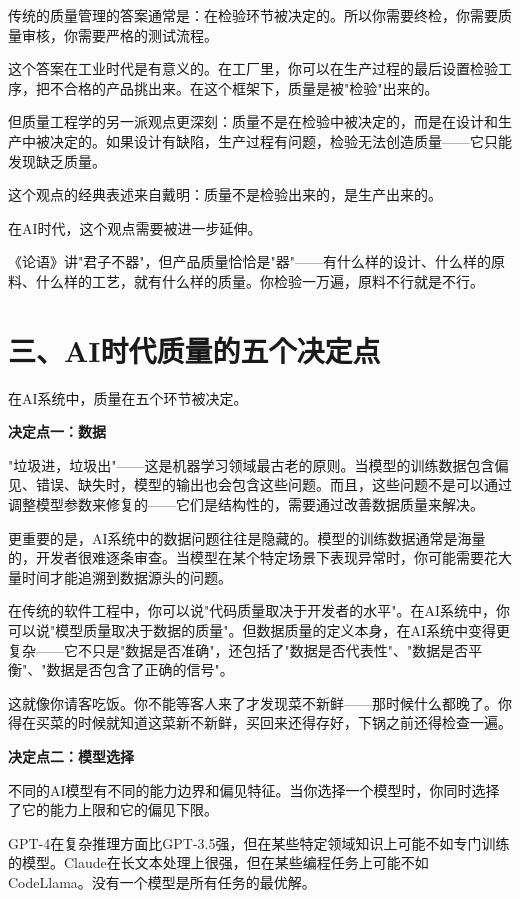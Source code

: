 传统的质量管理的答案通常是：在检验环节被决定的。所以你需要终检，你需要质量审核，你需要严格的测试流程。

这个答案在工业时代是有意义的。在工厂里，你可以在生产过程的最后设置检验工序，把不合格的产品挑出来。在这个框架下，质量是被"检验"出来的。

但质量工程学的另一派观点更深刻：质量不是在检验中被决定的，而是在设计和生产中被决定的。如果设计有缺陷，生产过程有问题，检验无法创造质量——它只能发现缺乏质量。

这个观点的经典表述来自戴明：质量不是检验出来的，是生产出来的。

在AI时代，这个观点需要被进一步延伸。

《论语》讲"君子不器"，但产品质量恰恰是"器"——有什么样的设计、什么样的原料、什么样的工艺，就有什么样的质量。你检验一万遍，原料不行就是不行。

\section{三、AI时代质量的五个决定点}


在AI系统中，质量在五个环节被决定。

\textbf{决定点一：数据}

"垃圾进，垃圾出"——这是机器学习领域最古老的原则。当模型的训练数据包含偏见、错误、缺失时，模型的输出也会包含这些问题。而且，这些问题不是可以通过调整模型参数来修复的——它们是结构性的，需要通过改善数据质量来解决。

更重要的是，AI系统中的数据问题往往是隐藏的。模型的训练数据通常是海量的，开发者很难逐条审查。当模型在某个特定场景下表现异常时，你可能需要花大量时间才能追溯到数据源头的问题。

在传统的软件工程中，你可以说"代码质量取决于开发者的水平"。在AI系统中，你可以说"模型质量取决于数据的质量"。但数据质量的定义本身，在AI系统中变得更复杂——它不只是"数据是否准确"，还包括了"数据是否代表性"、"数据是否平衡"、"数据是否包含了正确的信号"。

这就像你请客吃饭。你不能等客人来了才发现菜不新鲜——那时候什么都晚了。你得在买菜的时候就知道这菜新不新鲜，买回来还得存好，下锅之前还得检查一遍。

\textbf{决定点二：模型选择}

不同的AI模型有不同的能力边界和偏见特征。当你选择一个模型时，你同时选择了它的能力上限和它的偏见下限。

GPT-4在复杂推理方面比GPT-3.5强，但在某些特定领域知识上可能不如专门训练的模型。Claude在长文本处理上很强，但在某些编程任务上可能不如CodeLlama。没有一个模型是所有任务的最优解。

